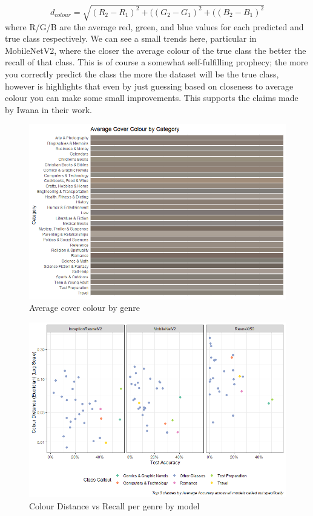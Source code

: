 \documentclass[12pt]{article}
\numberwithin{equation}{section}
\numberwithin{figure}{section}
\begin{document}
\begin{equation}
	d_{colour} = \sqrt{(R_2 - R_1)^2 + ((G_2 - G_1)^2 +((B_2 - B_1)^2 }
\end{equation}
where R/G/B are the average red, green, and blue values for each predicted and true class respectively. We can see a small trends here, particular in MobileNetV2, where the closer the average colour of the true class the better the recall of that class. This is of course a somewhat self-fulfilling prophecy; the more you correctly predict the class the more the dataset will be the true class, however is highlights that even by just guessing based on closeness to average colour you can make some small improvements. This supports the claims made by Iwana in their work. 


\begin{figure}
	\centering
	\captionsetup{justification=centering}
	\includegraphics[scale=0.45]{avg_col_plot.png}
	\caption{Average cover colour by genre}
	\label{fig:avg_col}
\end{figure}

\begin{figure}
	\centering
	\captionsetup{justification=centering}
	\includegraphics[scale=0.6]{col_dist_plot.png}
	\caption{Colour Distance vs Recall per genre by model}
	\label{fig:col_distance}
\end{figure}
\end{document}
